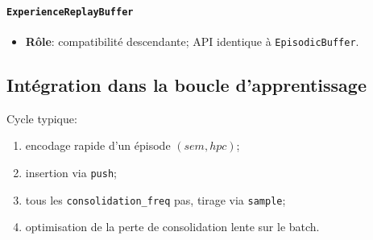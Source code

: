 \documentclass[12pt,a4paper]{article}
\begin{document}
\paragraph{\texttt{ExperienceReplayBuffer}}
\begin{itemize}[leftmargin=*]
    \item \textbf{Rôle}: compatibilité descendante; API identique à \texttt{EpisodicBuffer}.
\end{itemize}

\subsection{Intégration dans la boucle d'apprentissage}
Cycle typique:
\begin{enumerate}[leftmargin=*]
    \item encodage rapide d'un épisode $(sem, hpc)$;
    \item insertion via \texttt{push};
    \item tous les \texttt{consolidation\_freq} pas, tirage via \texttt{sample};
    \item optimisation de la perte de consolidation lente sur le batch.
\end{enumerate}
\end{document}
